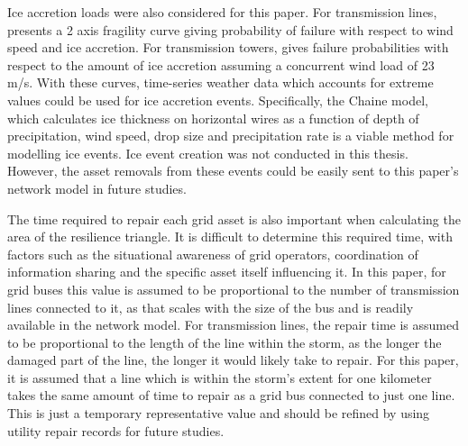 \documentclass[12pt]{article}
\begin{document}
Ice accretion loads were also considered for this paper. For transmission lines, \cite{Xiao2024} presents a 2 axis fragility curve giving probability of failure with respect to wind speed and ice accretion. For transmission towers, \cite{Rezaei} gives failure probabilities with respect to the amount of ice accretion assuming a concurrent wind load of 23 m/s. With these curves, time-series weather data which accounts for extreme values could be used for ice accretion events. Specifically, the Chaine model, which calculates ice thickness on horizontal wires as a function of depth of precipitation, wind speed, drop size and precipitation rate \cite{Sheng2023} is a viable method for modelling ice events. Ice event creation was not conducted in this thesis. However, the asset removals from these events could be easily sent to this paper’s network model in future studies. \par
The time required to repair each grid asset is also important when calculating the area of the resilience triangle. It is difficult to determine this required time, with factors such as the situational awareness of grid operators, coordination of information sharing and the specific asset itself \cite{panteli} influencing it. In this paper, for grid buses this value is assumed to be proportional to the number of transmission lines connected to it, as that scales with the size of the bus and is readily available in the network model. For transmission lines, the repair time is assumed to be proportional to the length of the line within the storm, as the longer the damaged part of the line, the longer it would likely take to repair. For this paper, it is assumed that a line which is within the storm’s extent for one kilometer takes the same amount of time to repair as a grid bus connected to just one line. This is just a temporary representative value and should be refined by using utility repair records for future studies.
\end{document}
